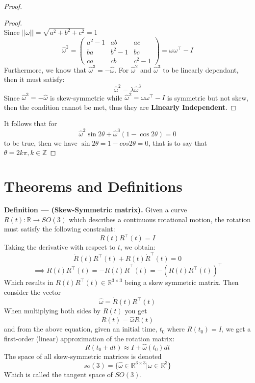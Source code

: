 \documentclass{article}
\begin{document}
\begin{proof}
\begin{proof}
$$        $$
        Since $||\omega|| = \sqrt{a^2 + b^2 + c^2} =1$
        $$\hat{\omega}^2 = \begin{pmatrix}a^2-1&ab&ac\\ ba&b^2-1&bc\\ ca&cb&c^2-1\end{pmatrix} = \omega\omega^\top - I$$
        Furthermore, we know that $\hat{\omega}^3 = -\hat{\omega}$. For $\hat{\omega}^2$ and $\hat{\omega}^3$ to be linearly dependant, then it must satisfy:
        $$\hat{\omega}^2 = \lambda\hat{\omega}^3$$
        Since $\hat{\omega}^3 = -\hat{\omega}$ is skew-symmetric while $\hat{\omega}^2=\omega\omega^\top-I$ is symmetric but not skew, then the condition cannot be met, thus they are \textbf{Linearly Independent}.
    \end{proof}
    It follows that for $$\hat{\omega}^2\sin{2\theta} + \hat{\omega}^3(1-\cos{2\theta}) = 0$$
    to be true, then we have $\sin{2\theta}=1-cos{2\theta}=0$, that is to say that $\theta = 2k\pi, k\in\mathbb{Z}$
\end{proof}






 \newpage
\section{Theorems and Definitions}
\begin{tcolorbox}[enhanced,breakable, toggle left and right,sharp corners, colback=purple!5!white, colframe=purple!55!black, boxrule=0mm,top=0mm,bottom=0mm,leftrule=1mm, drop shadow=black!40!white]
    {\color{purple!55!black} \textbf{Definition --- (Skew-Symmetric matrix).}} Given a curve $R(t) : \mathbb{R} \to SO(3)$ which describes a continuous rotational motion, the rotation must satisfy the following constraint: $$R(t)R^\top(t) = I$$
    Taking the derivative with respect to $t$, we obtain:
    $$\dot R(t)R^\top(t) + R(t)\dot R^\top(t) = 0$$
    $$\implies \dot R(t)R^\top(t) = -R(t)\dot R^\top(t) = -(\dot R(t)R^\top(t))^\top$$
    Which results in $R(t)R^\top(t) \in \mathbb{R}^{3\times 3}$ being a skew symmetric matrix. Then consider the vector $$\hat{\omega} = \dot R(t)R^\top(t)$$
    When multiplying both sides by $R(t)$ you get
    $$\dot R(t) = \hat{\omega}R(t)$$
    and from the above equation, given an initial time, $t_0$ where $R(t_0) = I$, we get a first-order (linear) approximation of the rotation matrix:
    $$R(t_0 + dt) \approx I + \hat{\omega}(t_0)dt$$ 
    The space of all skew-symmetric matrices is denoted
    $$so(3) = \{ \hat{\omega} \in \mathbb{R}^{3\times 3} | \omega \in \mathbb{R}^3\}$$
    Which is called the tangent space of $SO(3)$.
\end{tcolorbox}
\end{document}
